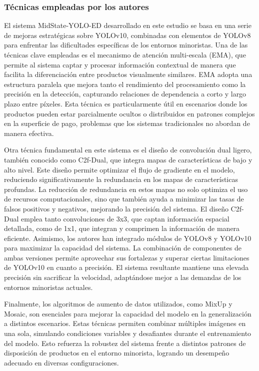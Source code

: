 \subsubsection{Técnicas empleadas por los autores}
El sistema MidState-YOLO-ED desarrollado en este estudio se basa en una serie de mejoras estratégicas sobre YOLOv10, combinadas con elementos de YOLOv8 para enfrentar las dificultades específicas de los entornos minoristas. Una de las técnicas clave empleadas es el mecanismo de atención multi-escala (EMA), que permite al sistema captar y procesar información contextual de manera que facilita la diferenciación entre productos visualmente similares. EMA adopta una estructura paralela que mejora tanto el rendimiento del procesamiento como la precisión en la detección, capturando relaciones de dependencia a corto y largo plazo entre píxeles. Esta técnica es particularmente útil en escenarios donde los productos pueden estar parcialmente ocultos o distribuidos en patrones complejos en la superficie de pago, problemas que los sistemas tradicionales no abordan de manera efectiva.

Otra técnica fundamental en este sistema es el diseño de convolución dual ligero, también conocido como C2f-Dual, que integra mapas de características de bajo y alto nivel. Este diseño permite optimizar el flujo de gradiente en el modelo, reduciendo significativamente la redundancia en los mapas de características profundas. La reducción de redundancia en estos mapas no solo optimiza el uso de recursos computacionales, sino que también ayuda a minimizar las tasas de falsos positivos y negativos, mejorando la precisión del sistema. El diseño C2f-Dual emplea tanto convoluciones de 3x3, que captan información espacial detallada, como de 1x1, que integran y comprimen la información de manera eficiente. Asimismo, los autores han integrado módulos de YOLOv8 y YOLOv10 para maximizar la capacidad del sistema. La combinación de componentes de ambas versiones permite aprovechar sus fortalezas y superar ciertas limitaciones de YOLOv10 en cuanto a precisión. El sistema resultante mantiene una elevada precisión sin sacrificar la velocidad, adaptándose mejor a las demandas de los entornos minoristas actuales.

Finalmente, los algoritmos de aumento de datos utilizados, como MixUp y Mosaic, son esenciales para mejorar la capacidad del modelo en la generalización a distintos escenarios. Estas técnicas permiten combinar múltiples imágenes en una sola, simulando condiciones variables y desafiantes durante el entrenamiento del modelo. Esto refuerza la robustez del sistema frente a distintos patrones de disposición de productos en el entorno minorista, logrando un desempeño adecuado en diversas configuraciones.


